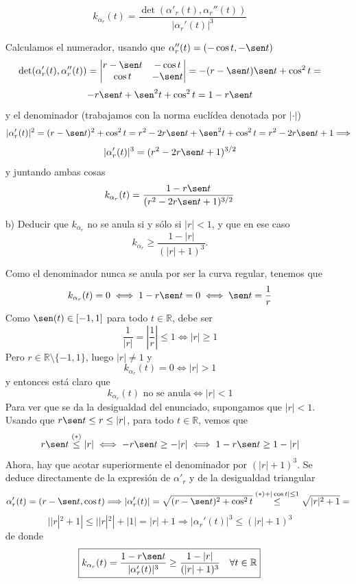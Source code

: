\documentclass[12pt]{article}
\newcommand{\R}{\mathbb{R}}
\begin{document}
\begin{ejercicio}
\begin{enumerate}
            $$k_{\alpha_r}(t) = \dfrac{\det(\alpha'_r(t), \alpha_r''(t))}{|\alpha_r'(t)|^3}$$

            Calculamos el numerador, usando que $\alpha_r''(t) = (- \cos t, -\sen t)$
            $$\det(\alpha'_r(t), \alpha_r''(t)) = \begin{vmatrix}
                r - \sen t & -\cos t \\
                \cos t & - \sen t
            \end{vmatrix} = -(r- \sen t)\sen t + \cos^2t =$$
            $$- r \sen t + \sen^2t + \cos^2 t = 1 - r \sen t$$
            y el denominador (trabajamos con la norma euclídea denotada por $| \cdot |$)
            $$|\alpha_r'(t)|^2 = (r - \sen t)^2 + \cos^2 t = r^2 - 2r\sen t + \sen^2t + \cos^2t = 
            r^2 - 2r \sen t + 1 \Longrightarrow$$
            $$|\alpha_r'(t)|^3 = (r^2 - 2r \sen t + 1)^{3/2}$$
            y juntando ambas cosas
            $$k_{\alpha_r}(t) = \dfrac{1 - r \sen t}{(r^2 - 2r \sen t + 1)^{3/2}}$$

            \item[b)] Deducir que $k_{\alpha_r}$ no se anula si y sólo si $|r|<1$, y que en ese caso
            $$
            k_{\alpha_r}\geq \frac{1-|r|}{(|r|+1)^3}.
            $$

            Como el denominador nunca se anula por ser la curva regular, tenemos que 
            $$k_{\alpha_r}(t) = 0 \iff 1 - r \sen t = 0 \iff \sen t = \dfrac{1}{r}$$
            Como $\sen(t) \in [-1,1]$ para todo $t \in \R$, debe ser 
            $$\dfrac{1}{|r|} = \left| \dfrac{1}{r} \right| \leq 1 \iff |r| \geq 1$$
            Pero $r \in \R \setminus \{-1,1\}$, luego $|r| \neq 1$ y
            $$k_{\alpha_r}(t) = 0 \iff |r| > 1$$ 
            y entonces está claro que
            $$k_{\alpha_r}(t) \text{ no se anula} \iff |r| < 1$$
            Para ver que se da la desigualdad del enunciado, supongamos que $|r| < 1$. Usando que 
            $r \sen t \leq r \leq |r|$, para todo $t \in \R$, vemos que 
            $$r \sen t \stackrel{(*)}{\leq} |r| \iff - r \sen t \geq -|r| \iff 1 - r \sen t \geq 1 - |r|$$
            Ahora, hay que acotar superiormente el denominador por $(|r| + 1)^3$. Se deduce directamente de
            la expresión de $\alpha'_r$ y de la desigualdad triangular
            $$\alpha'_r(t) = (r - \sen t, \cos t) \Longrightarrow |\alpha'_r(t)| = 
            \sqrt{(r - \sen t)^2 + \cos^2t} \stackrel{(*) + |\cos t| \leq 1}{\leq} \sqrt{|r|^2 + 1} = $$
            $$||r|^2+1| \leq ||r|^2| + |1| = |r| + 1 \Longrightarrow |\alpha_r'(t)|^3 \leq (|r| + 1)^3$$
            de donde
            $$\boxed{k_{\alpha_r}(t) = \dfrac{1 - r \sen t}{|\alpha_r'(t)|^3} \geq \dfrac{1 - |r|}{(|r| + 1)^3} \quad \forall t \in \R}$$
        \end{enumerate}
    \end{ejercicio}
\end{document}
